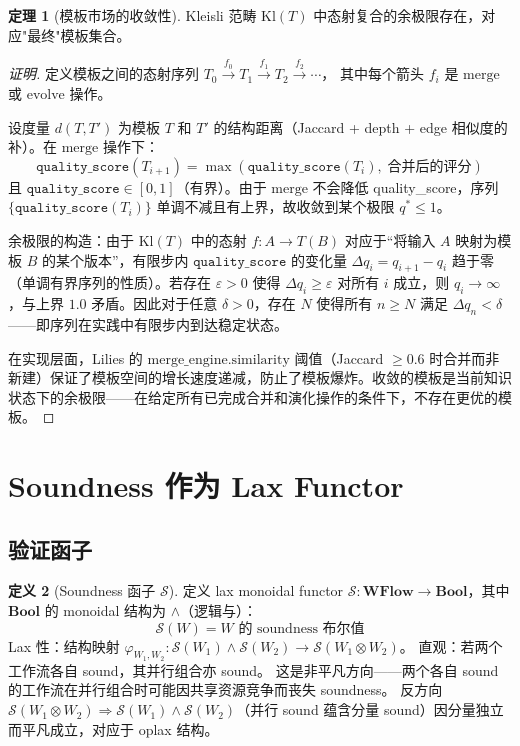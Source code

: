\documentclass[11pt,a4paper]{article}
\theoremstyle{definition}
\newtheorem{theorem}{定理}[section]
\theoremstyle{definition}
\newtheorem{definition}[theorem]{定义}
\theoremstyle{remark}
\newcommand{\cat}[1]{\mathbf{#1}}
\newcommand{\catWFlow}{\cat{WFlow}}
\newcommand{\catBool}{\cat{Bool}}
\newcommand{\functor}[3]{#1: #2 \to #3}
\newcommand{\tensor}{\otimes}
\newcommand{\monadT}{T}
\begin{document}
\begin{theorem}[模板市场的收敛性]
Kleisli 范畴 $\mathrm{Kl}(\monadT)$ 中态射复合的余极限存在，对应"最终"模板集合。
\end{theorem}

\begin{proof}[证明]
定义模板之间的态射序列 $T_0 \xrightarrow{f_0} T_1 \xrightarrow{f_1} T_2 \xrightarrow{f_2} \cdots$，
其中每个箭头 $f_i$ 是 $\mathrm{merge}$ 或 $\mathrm{evolve}$ 操作。

设度量 $d(T, T')$ 为模板 $T$ 和 $T'$ 的结构距离（Jaccard + depth + edge 相似度的补）。在 $\mathrm{merge}$ 操作下：
\[
\mathtt{quality\_score}(T_{i+1}) = \max(\mathtt{quality\_score}(T_i),\; \text{合并后的评分})
\]
且 $\mathtt{quality\_score} \in [0, 1]$（有界）。由于 $\mathrm{merge}$ 不会降低 quality\_score，序列 $\{\mathtt{quality\_score}(T_i)\}$ 单调不减且有上界，故收敛到某个极限 $q^* \leq 1$。

余极限的构造：由于 $\mathrm{Kl}(\monadT)$ 中的态射 $f: A \to \monadT(B)$ 对应于``将输入 $A$ 映射为模板 $B$ 的某个版本''，有限步内 $\mathtt{quality\_score}$ 的变化量 $\Delta q_i = q_{i+1} - q_i$ 趋于零（单调有界序列的性质）。若存在 $\varepsilon > 0$ 使得 $\Delta q_i \geq \varepsilon$ 对所有 $i$ 成立，则 $q_i \to \infty$，与上界 $1.0$ 矛盾。因此对于任意 $\delta > 0$，存在 $N$ 使得所有 $n \geq N$ 满足 $\Delta q_n < \delta$——即序列在实践中有限步内到达稳定状态。

在实现层面，Lilies 的 $\mathrm{merge\_engine.similarity}$ 阈值（Jaccard $\geq 0.6$ 时合并而非新建）保证了模板空间的增长速度递减，防止了模板爆炸。收敛的模板是当前知识状态下的余极限——在给定所有已完成合并和演化操作的条件下，不存在更优的模板。
\end{proof}

\section{Soundness 作为 Lax Functor}

\subsection{验证函子}

\begin{definition}[Soundness 函子 $\mathcal{S}$]
定义 lax monoidal functor $\functor{\mathcal{S}}{\catWFlow}{\catBool}$，其中 $\catBool$ 的 monoidal 结构为 $\land$（逻辑与）：
\[
\mathcal{S}(W) = \text{$W$ 的 soundness 布尔值}
\]
Lax 性：结构映射 $\varphi_{W_1, W_2}: \mathcal{S}(W_1) \land \mathcal{S}(W_2) \to \mathcal{S}(W_1 \tensor W_2)$。
直观：若两个工作流各自 sound，其并行组合亦 sound。
这是非平凡方向——两个各自 sound 的工作流在并行组合时可能因共享资源竞争而丧失 soundness。
反方向 $\mathcal{S}(W_1 \tensor W_2) \Rightarrow \mathcal{S}(W_1) \land \mathcal{S}(W_2)$（并行 sound 蕴含分量 sound）因分量独立而平凡成立，对应于 oplax 结构。
\end{definition}
\end{document}

